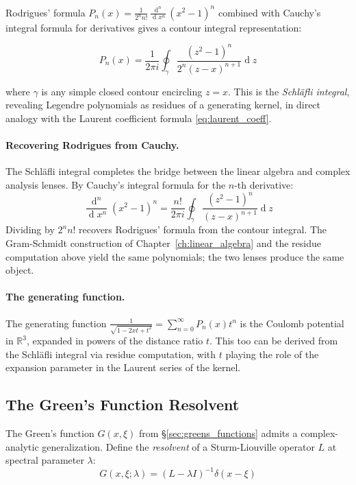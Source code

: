 \documentclass[12pt,a4paper]{report}
\DeclareMathOperator{\deriv}{d}
\theoremstyle{thms}
\theoremstyle{defns}
\begin{document}
Rodrigues' formula $P_n(x) = \frac{1}{2^n n!}\frac{\deriv^n}{\deriv x^n}(x^2 - 1)^n$ combined with Cauchy's integral formula for derivatives gives a contour integral representation:

\begin{equation}
    P_n(x) = \dfrac{1}{2\pi i}\oint_\gamma \dfrac{(z^2 - 1)^n}{2^n(z - x)^{n+1}}\deriv{z}
    \label{eq:schlafli}
\end{equation}

where $\gamma$ is any simple closed contour encircling $z = x$. This is the \textit{Schl\"{a}fli integral}, revealing Legendre polynomials as residues of a generating kernel, in direct analogy with the Laurent coefficient formula \eqref{eq:laurent_coeff}.

\paragraph{Recovering Rodrigues from Cauchy.} The Schl\"{a}fli integral completes the bridge between the linear algebra and complex analysis lenses. By Cauchy's integral formula for the $n$-th derivative:
\begin{equation}
    \dfrac{\deriv^n}{\deriv x^n}(x^2 - 1)^n = \dfrac{n!}{2\pi i}\oint_\gamma \dfrac{(z^2 - 1)^n}{(z - x)^{n+1}}\deriv{z}
\end{equation}
Dividing by $2^n n!$ recovers Rodrigues' formula from the contour integral. The Gram-Schmidt construction of Chapter~\ref{ch:linear_algebra} and the residue computation above yield the same polynomials; the two lenses produce the same object.

\paragraph{The generating function.} The generating function $\frac{1}{\sqrt{1 - 2xt + t^2}} = \sum_{n=0}^{\infty} P_n(x) t^n$ is the Coulomb potential in $\mathbb{R}^3$, expanded in powers of the distance ratio $t$. This too can be derived from the Schl\"{a}fli integral via residue computation, with $t$ playing the role of the expansion parameter in the Laurent series of the kernel.

\subsection{The Green's Function Resolvent}

The Green's function $G(x, \xi)$ from \S\ref{sec:greens_functions} admits a complex-analytic generalization. Define the \textit{resolvent} of a Sturm-Liouville operator $L$ at spectral parameter $\lambda$:
\begin{equation}
    G(x, \xi; \lambda) = (L - \lambda I)^{-1}\delta(x - \xi)
\end{equation}
\end{document}
